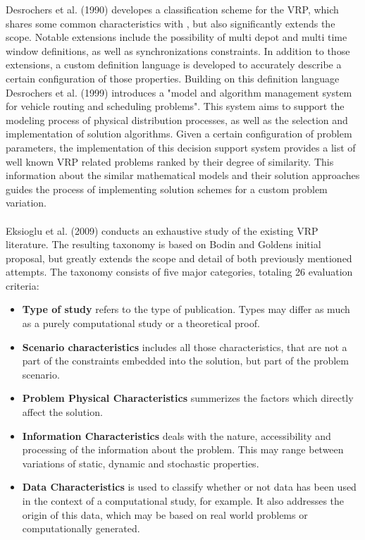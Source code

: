 Desrochers et al. (1990) \cite{desrochers_classification_1990} developes a classification scheme for the VRP, which shares some common characteristics with \cite{bodin_classification_1981}, but also significantly extends the scope. Notable extensions include the possibility of multi depot and multi time window definitions, as well as synchronizations constraints. In addition to those extensions, a custom definition language is developed to accurately describe a certain configuration of those properties. Building on this definition language Desrochers et al. (1999) \cite{desrochers_towards_1999} introduces a "model and algorithm management system for vehicle routing and scheduling problems". This system aims to support the modeling process of physical distribution processes, as well as the selection and implementation of solution algorithms. Given a certain configuration of problem parameters, the implementation of this decision support system provides a list of well known VRP related problems ranked by their degree of similarity. This information about the similar mathematical models and their solution approaches guides the process of implementing solution schemes for a custom problem variation.\\ \\
Eksioglu et al. (2009) \cite{eksioglu_vehicle_2009} conducts an exhaustive study of the existing VRP literature. The resulting taxonomy is based on Bodin and Goldens initial proposal, but greatly extends the scope and detail of both previously mentioned attempts. The taxonomy consists of five major categories, totaling 26 evaluation criteria:
\begin{itemize}
\item \textbf{Type of study} refers to the type of publication. Types may differ as much as a purely computational study or a theoretical proof.
\item \textbf{Scenario characteristics} includes all those characteristics, that are not a part of the constraints embedded into the solution, but part of the problem scenario.
\item \textbf{Problem Physical Characteristics} summerizes the factors which directly affect the solution.
\item \textbf{Information Characteristics} deals with the nature, accessibility and processing of the information about the problem. This may range between variations of static, dynamic and stochastic properties.
\item \textbf{Data Characteristics} is used to classify whether or not data has been used in the context of a computational study, for example. It also addresses the origin of this data, which may be based on real world problems or computationally generated.
\end{itemize}
